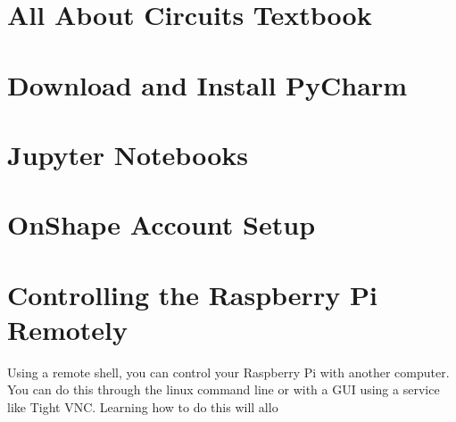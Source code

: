 \documentclass[
]{book}
\begin{document}
\hypertarget{all-about-circuits-textbook}{%
\section{All About Circuits Textbook}\label{all-about-circuits-textbook}}

\hypertarget{download-and-install-pycharm}{%
\section{Download and Install PyCharm}\label{download-and-install-pycharm}}

\hypertarget{jupyter-notebooks}{%
\section{Jupyter Notebooks}\label{jupyter-notebooks}}

\hypertarget{onshape-account-setup}{%
\section{OnShape Account Setup}\label{onshape-account-setup}}

\hypertarget{controlling-the-raspberry-pi-remotely}{%
\section{Controlling the Raspberry Pi Remotely}\label{controlling-the-raspberry-pi-remotely}}

Using a remote shell, you can control your Raspberry Pi with another computer. You can do this through the linux command line or with a GUI using a service like Tight VNC. Learning how to do this will allo

  
\end{document}
